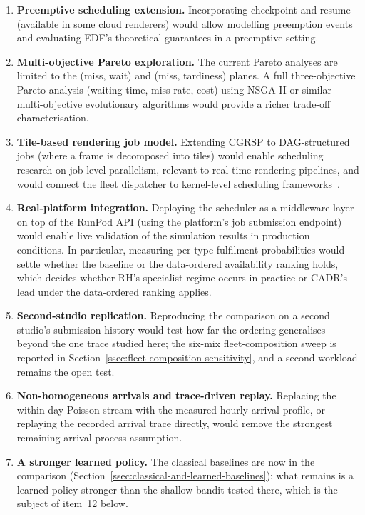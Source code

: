 {\begin{enumerate}
  \item \textbf{Preemptive scheduling extension.} Incorporating checkpoint-and-resume (available in some cloud renderers) would allow modelling preemption events and evaluating EDF's theoretical guarantees in a preemptive setting.

  \item \textbf{Multi-objective Pareto exploration.} The current Pareto analyses are limited to the (miss, wait) and (miss, tardiness) planes. A full three-objective Pareto analysis (waiting time, miss rate, cost) using NSGA-II or similar multi-objective evolutionary algorithms would provide a richer trade-off characterisation.

  \item \textbf{Tile-based rendering job model.} Extending CGRSP to DAG-structured jobs (where a frame is decomposed into tiles) would enable scheduling research on job-level parallelism, relevant to real-time rendering pipelines, and would connect the fleet dispatcher to kernel-level scheduling frameworks~\cite{chien2018graph,chang2020dependent}.

  \item \textbf{Real-platform integration.} Deploying the scheduler as a middleware layer on top of the RunPod API (using the platform's job submission endpoint) would enable live validation of the simulation results in production conditions. In particular, measuring per-type fulfilment probabilities would settle whether the baseline or the data-ordered availability ranking holds, which decides whether RH's specialist regime occurs in practice or CADR's lead under the data-ordered ranking applies.

  \item \textbf{Second-studio replication.} Reproducing the comparison on a second studio's submission history would test how far the ordering generalises beyond the one trace studied here; the six-mix fleet-composition sweep is reported in Section~\ref{ssec:fleet-composition-sensitivity}, and a second workload remains the open test.

  \item \textbf{Non-homogeneous arrivals and trace-driven replay.} Replacing the within-day Poisson stream with the measured hourly arrival profile, or replaying the recorded arrival trace directly, would remove the strongest remaining arrival-process assumption.

  \item \textbf{A stronger learned policy.} The classical baselines are now in the comparison (Section~\ref{ssec:classical-and-learned-baselines}); what remains is a learned policy stronger than the shallow bandit tested there, which is the subject of item~12 below.


\end{enumerate}}
